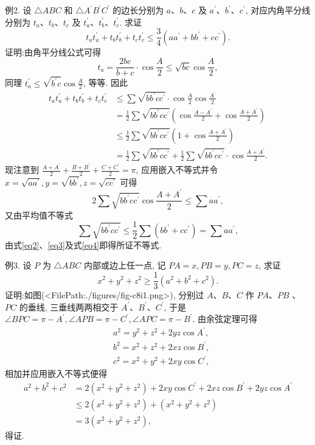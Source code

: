 例2. 设 $\triangle A B C$ 和 $\triangle A^{\prime} B^{\prime} C^{\prime}$ 的边长分别为 $a 、 b 、 c$ 及 $a^{\prime} 、 b^{\prime} 、 c^{\prime}$, 对应内角平分线分别为 $t_a 、 t_b 、 t_c$ 及 $t_a^{\prime} 、 t_b^{\prime} 、 t_c^{\prime}$. 求证
$$
t_a t_a^{\prime}+t_b t_b^{\prime}+t_c t_c^{\prime} \leqslant \frac{3}{4}\left(a a^{\prime}+b b^{\prime}+c c^{\prime}\right) . \label{eq1}
$$
证明:由角平分线公式可得
$$
t_a=\frac{2 b c}{b+c} \cdot \cos \frac{A}{2} \leqslant \sqrt{b c} \cos \frac{A}{2},
$$
同理 $t_a^{\prime} \leqslant \sqrt{b^{\prime} c} \cos \frac{A}{2}$, 等等.
因此
$$
\begin{aligned}
t_a t_a^{\prime}+t_b t_b^{\prime}+t_c t_c^{\prime} & \leqslant \sum \sqrt{b b^{\prime} c c^{\prime}} \cdot \cos \frac{A}{2} \cos \frac{A^{\prime}}{2} \\
& =\frac{1}{2} \sum \sqrt{b b^{\prime} c c^{\prime}}\left(\cos \frac{A-A^{\prime}}{2}+\cos \frac{A+A^{\prime}}{2}\right) \\
& \leqslant \frac{1}{2} \sum \sqrt{b b^{\prime} c c^{\prime}}\left(1+\cos \frac{A+A^{\prime}}{2}\right) \\
& =\frac{1}{2} \sum \sqrt{b b^{\prime} c c^{\prime}}+\frac{1}{2} \sum \sqrt{b b^{\prime} c c^{\prime}} \cdot \cos \frac{A+A^{\prime}}{2} . \label{eq2}
\end{aligned}
$$
现注意到 $\frac{A+A^{\prime}}{2}+\frac{B+B^{\prime}}{2}+\frac{C+C^{\prime}}{2}=\pi$, 应用嵌入不等式并令 $x= \sqrt{a a^{\prime}}, y=\sqrt{b b^{\prime}}, z=\sqrt{c c^{\prime}}$ 可得
$$
2 \sum \sqrt{b b^{\prime} c c^{\prime}} \cos \frac{A+A^{\prime}}{2} \leqslant \sum a a^{\prime}, \label{eq3}
$$
又由平均值不等式
$$
\sum \sqrt{b b^{\prime} c c^{\prime}} \leqslant \frac{1}{2} \sum\left(b b^{\prime}+c c^{\prime}\right)=\sum a a^{\prime}, \label{eq4}
$$
由式\ref{eq2}、\ref{eq3}及式\ref{eq4}即得所证不等式.



例3. 设 $P$ 为 $\triangle A B C$ 内部或边上任一点, 记 $P A=x, P B=y, P C=z$,
求证
$$
x^2+y^2+z^2 \geqslant \frac{1}{3}\left(a^2+b^2+c^2\right) .
$$
证明:如图(<FilePath:./figures/fig-c8i1.png>), 分别过 $A 、 B 、 C$ 作 $P A 、 P B$ 、 $P C$ 的垂线, 三垂线两两相交于 $A^{\prime} 、 B^{\prime} 、 C^{\prime}$, 于是 $\angle B P C=\pi-A^{\prime}, \angle A P B=\pi-C^{\prime}, \angle A P C=\pi- B^{\prime}$. 由余弦定理可得
$$
\begin{aligned}
& a^2=y^2+z^2+2 y z \cos A^{\prime}, \\
& b^2=x^2+z^2+2 x z \cos B^{\prime}, \\
& c^2=x^2+y^2+2 x y \cos C^{\prime},
\end{aligned}
$$
相加并应用嵌入不等式便得
$$
\begin{aligned}
a^2+b^2+c^2 & =2\left(x^2+y^2+z^2\right)+2 x y \cos C^{\prime}+2 x z \cos B^{\prime}+2 y z \cos A^{\prime} \\
& \leqslant 2\left(x^2+y^2+z^2\right)+\left(x^2+y^2+z^2\right) \\
& =3\left(x^2+y^2+z^2\right),
\end{aligned}
$$
得证.



